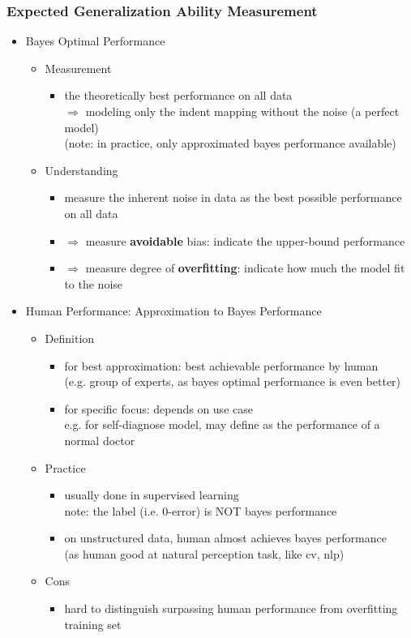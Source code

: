 \subsubsection{Expected Generalization Ability Measurement}
\begin{itemize}
\item Bayes Optimal Performance
	\begin{itemize}
	\item Measurement
		\begin{itemize}
		\item the theoretically best performance on all data \\ 
		$\Rightarrow$ modeling only the indent mapping without the noise (a perfect model) \\
		(note: in practice, only approximated bayes performance available)
		\end{itemize}
	\item Understanding
		\begin{itemize}
		\item measure the inherent noise in data as the best possible performance on all data
		\item $\Rightarrow$ measure \textbf{avoidable} bias: indicate the upper-bound performance
		\item $\Rightarrow$ measure degree of \textbf{overfitting}: indicate how much the model fit to the noise
		\end{itemize}
	\end{itemize}

\item Human Performance: Approximation to Bayes Performance
	\begin{itemize}
	\item Definition
		\begin{itemize}
		\item for best approximation: best achievable performance by human \\  (e.g. group of experts, as bayes optimal performance is even better)
		\item for specific focus: depends on use case \\
		e.g. for self-diagnose model, may define as the performance of a normal doctor
		\end{itemize}
	\item Practice
		\begin{itemize}
		\item usually done in supervised learning \\
		note: the label (i.e. $0$-error) is NOT bayes performance
		\item on unstructured data, human almost achieves bayes performance \\
		(as human good at natural perception task, like cv, nlp)
		\end{itemize}
	\item Cons
		\begin{itemize}
		\item hard to distinguish surpassing human performance from overfitting training set
		\end{itemize}
	\end{itemize}


\end{itemize}
